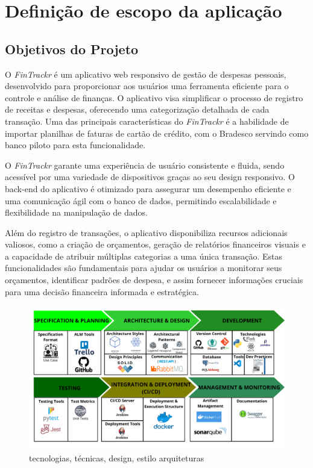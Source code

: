 \chapter{Definição de escopo da aplicação}

\section{Objetivos do Projeto}
O \textit{FinTrackr} é um aplicativo web responsivo de gestão de despesas pessoais, desenvolvido para proporcionar aos usuários uma ferramenta eficiente para o controle e análise de finanças. O aplicativo visa simplificar o processo de registro de receitas e despesas, oferecendo uma categorização detalhada de cada transação. Uma das principais características do \textit{FinTrackr} é a habilidade de importar planilhas de faturas de cartão de crédito, com o Bradesco servindo como banco piloto para esta funcionalidade.

O \textit{FinTrackr} garante uma experiência de usuário consistente e fluida, sendo acessível por uma variedade de dispositivos graças ao seu design responsivo. O back-end do aplicativo é otimizado para assegurar um desempenho eficiente e uma comunicação ágil com o banco de dados, permitindo escalabilidade e flexibilidade na manipulação de dados.

Além do registro de transações, o aplicativo disponibiliza recursos adicionais valiosos, como a criação de orçamentos, geração de relatórios financeiros visuais e a capacidade de atribuir múltiplas categorias a uma única transação. Estas funcionalidades são fundamentais para ajudar os usuários a monitorar seus orçamentos, identificar padrões de despesa, e assim fornecer informações cruciais para uma decisão financeira informada e estratégica.

\begin{figure}
	\centering
	\includegraphics[width=1\linewidth]{Textuais/FinTrackr.png}
	\caption{tecnologias, técnicas, design, estilo arquiteturas}
	\label{fig:fintrackr_technologies}
\end{figure}

